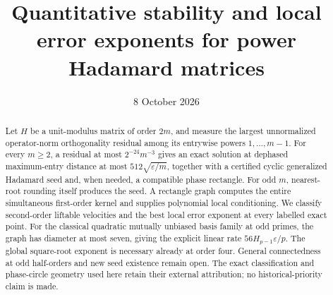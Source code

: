 \documentclass[11pt]{article}
\title{Quantitative stability and local error exponents for power Hadamard matrices}
\author{}
\date{8 October 2026}
\theoremstyle{definition}
\theoremstyle{remark}
\newcommand{\eps}{\varepsilon}
\begin{document}
\maketitle
\begin{abstract}
Let $H$ be a unit-modulus matrix of order $2m$, and measure the largest unnormalized operator-norm orthogonality residual among its entrywise powers $1,\ldots,m-1$. For every $m\ge2$, a residual at most $2^{-24}m^{-3}$ gives an exact solution at dephased maximum-entry distance at most $512\sqrt{\eps/m}$, together with a certified cyclic generalized Hadamard seed and, when needed, a compatible phase rectangle. For odd $m$, nearest-root rounding itself produces the seed. A rectangle graph computes the entire simultaneous first-order kernel and supplies polynomial local conditioning. We classify second-order liftable velocities and the best local error exponent at every labelled exact point. For the classical quadratic mutually unbiased basis family at odd primes, the graph has diameter at most seven, giving the explicit linear rate $56H_{p-1}\eps/p$. The global square-root exponent is necessary already at order four. General connectedness at odd half-orders and new seed existence remain open. The exact classification and phase-circle geometry used here retain their external attribution; no historical-priority claim is made.
\end{abstract}
\setcounter{tocdepth}{2}
\tableofcontents
\clearpage










\appendix



\end{document}
